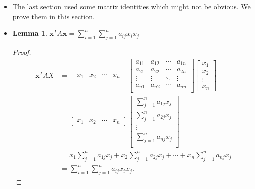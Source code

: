 \documentclass[10pt]{article}
\newtheorem{lemma}{Lemma}[section]
\newcommand{\x}{\mathbf{x}}
\begin{document}
  \begin{itemize}
    \item The last section used some matrix identities which might not be obvious. We prove them in this section.
    \item \begin{lemma} \label{xAx}
      $\x^T A \x = \sum_{i=1}^n \sum_{j=1}^n a_{ij} x_i x_j$
    \end{lemma}
    \begin{proof}
      \begin{align*}
        \x^T A X 
        &= \begin{bmatrix}
          x_1 & x_2 & \cdots & x_n
        \end{bmatrix}
        \begin{bmatrix}
          a_{11} & a_{12} & \cdots & a_{1n}\\
          a_{21} & a_{22} & \cdots & a_{2n}\\
          \vdots & \vdots & \ddots & \vdots\\
          a_{n1} & a_{n2} & \cdots & a_{nn}\\
        \end{bmatrix}        
        \begin{bmatrix}
          x_1 \\ x_2 \\ \vdots \\ x_n
        \end{bmatrix}\\
        &= \begin{bmatrix}
          x_1 & x_2 & \cdots & x_n
        \end{bmatrix}
        \begin{bmatrix}
          \sum_{j=1}^n a_{1j}x_j\\
          \sum_{j=1}^n a_{2j}x_j\\
          \vdots\\
          \sum_{j=1}^n a_{nj}x_j\\
        \end{bmatrix}\\
        &= x_1 \sum_{j=1}^n a_{1j}x_j + x_2 \sum_{j=1}^n a_{2j}x_j + \dotsb + x_n \sum_{j=1}^n a_{nj}x_j\\
        &= \sum_{i=1}^n \sum_{j=1}^n a_{ij} x_i x_j.
      \end{align*}          
    \end{proof}
    

\end{itemize}
\end{document}
